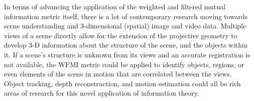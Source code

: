 In terms of advancing the application of the weighted and filtered mutual information metric itself, there is a lot of contemporary research moving towards scene understanding and 3-dimensional (spatial) image and video data. Multiple views of a scene directly allow for the extension of the projective geometry to develop 3-D information about the structure of the scene, and the objects within it. If a scene's structure is unknown from its views and an accurate registration is not available, the WFMI metric could be applied to identify objects, regions, or even elements of the scene in motion that are correlated between the views. Object tracking, depth reconstruction, and motion estimation could all be rich areas of research for this novel application of information theory.

